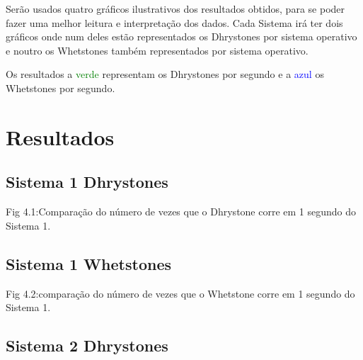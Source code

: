 \documentclass{report}
\begin{document}
Serão usados quatro gráficos ilustrativos dos resultados obtidos, para se poder fazer uma melhor leitura e interpretação dos dados. Cada Sistema irá ter dois gráficos onde num deles estão representados os Dhrystones por sistema operativo e noutro os Whetstones também representados por sistema operativo.

Os resultados a \textcolor{green}{verde} representam os Dhrystones por segundo e a \textcolor{blue}{azul} os Whetstones por segundo.
\section{Resultados}
\subsection{Sistema 1 Dhrystones}

Fig 4.1:Comparação do número de vezes que o Dhrystone corre em 1 segundo do Sistema 1.
\subsection{Sistema 1 Whetstones}

Fig 4.2:comparação do número de vezes que o Whetstone corre em 1 segundo do Sistema 1.

\subsection{Sistema 2 Dhrystones}
\end{document}
